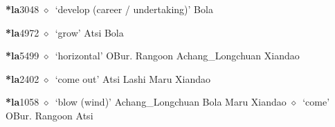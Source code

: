   \begin{list}{}{\leftmargin=1.5em \itemindent=-1.5em}
  \item {\footnotesize \textbf{*la}}{\tiny 3048}
         $\diamond$~`develop (career / undertaking)'
         Bola 
  \item {\footnotesize \textbf{*la}}{\tiny 4972}
\hspace{1ex}
         $\diamond$~`grow'
         Atsi 
\hspace{1ex}
         Bola 
  \item {\footnotesize \textbf{*la}}{\tiny 5499}
\hspace{1ex}
         $\diamond$~`horizontal'
         OBur. 
\hspace{1ex}
         Rangoon 
\hspace{1ex}
         Achang\_Longchuan 
\hspace{1ex}
         Xiandao 
  \item {\footnotesize \textbf{*la}}{\tiny 2402}
\hspace{1ex}
         $\diamond$~`come out'
         Atsi 
\hspace{1ex}
         Lashi 
\hspace{1ex}
         Maru 
\hspace{1ex}
         Xiandao 
  \item {\footnotesize \textbf{*la}}{\tiny 1058}
\hspace{1ex}
         $\diamond$~`blow (wind)'
         Achang\_Longchuan 
\hspace{1ex}
         Bola 
\hspace{1ex}
         Maru 
\hspace{1ex}
         Xiandao 
\hspace{1ex}
         $\diamond$~`come'
         OBur. 
\hspace{1ex}
         Rangoon 
\hspace{1ex}
         Atsi 
\hspace{1ex}

\end{list}
